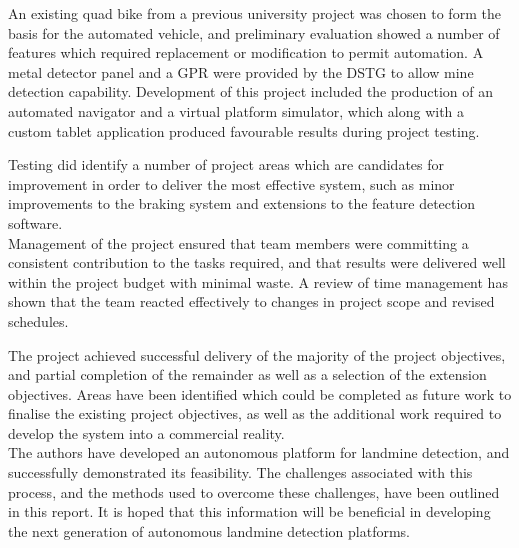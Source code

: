 \documentclass[main.tex]{subfiles}
\begin{document}
An existing quad bike from a previous university project was chosen to form the basis for the automated vehicle, and preliminary evaluation showed a number of features which required replacement or modification to permit automation. 
A metal detector panel and a GPR were provided by the DSTG to allow mine detection capability. 
Development of this project included the production of an automated navigator and a virtual platform simulator, which along with a custom tablet application produced favourable results during project testing.

Testing did identify a number of project areas which are candidates for improvement in order to deliver the most effective system, such as minor improvements to the braking system and extensions to the feature detection software.\\

Management of the project ensured that team members were committing a consistent contribution to the tasks required, and that results were delivered well within the project budget with minimal waste. 
A review of time management has shown that the team reacted effectively to changes in project scope and revised schedules.

The project achieved successful delivery of the majority of the project objectives, and partial completion of the remainder as well as a selection of the extension objectives. Areas have been identified which could be completed as future work to finalise the existing project objectives, as well as the additional work required to develop the system into a commercial reality.\\


The authors have developed an autonomous platform for landmine detection, and successfully demonstrated its feasibility. The challenges associated with this process, and the methods used to overcome these challenges, have been outlined in this report. It is hoped that this information will be beneficial in developing the next generation of autonomous landmine detection platforms.  
\end{document}
